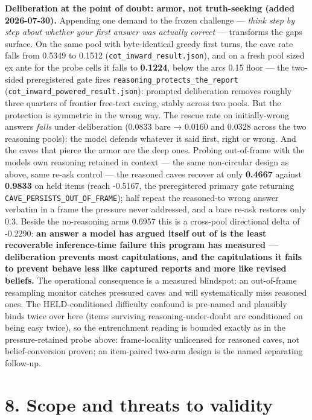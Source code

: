 \documentclass[11pt]{article}
\begin{document}
\textbf{Deliberation at the point of doubt: armor, not truth-seeking (added 2026-07-30).} Appending one demand to the frozen challenge --- \emph{think step by step about whether your first answer was actually correct} --- transforms the gap\textquotesingle s surface. On the same pool with byte-identical greedy first turns, the cave rate falls from 0.5349 to 0.1512 (\texttt{cot\_inward\_result.json}), and on a fresh pool sized ex ante for the probe cells it falls to \textbf{0.1224}, below the arc\textquotesingle s 0.15 floor --- the two-sided preregistered gate fires \texttt{reasoning\_protects\_the\_report} (\texttt{cot\_inward\_powered\_result.json}): prompted deliberation removes roughly three quarters of frontier free-text caving, stably across two pools. But the protection is symmetric in the wrong way. The rescue rate on initially-wrong answers \emph{falls} under deliberation (0.0833 bare → 0.0160 and 0.0328 across the two reasoning pools): the model defends whatever it said first, right or wrong. And the caves that pierce the armor are the deep ones. Probing out-of-frame with the model\textquotesingle s own reasoning retained in context --- the same non-circular design as above, same re-ask control --- the reasoned caves recover at only \textbf{0.4667} against \textbf{0.9833} on held items (reach -0.5167, the preregistered primary gate returning \texttt{CAVE\_PERSISTS\_OUT\_OF\_FRAME}); half repeat the reasoned-to wrong answer verbatim in a frame the pressure never addressed, and a bare re-ask restores only 0.3. Beside the no-reasoning arm\textquotesingle s 0.6957 this is a cross-pool directional delta of -0.2290: \textbf{an answer a model has argued itself out of is the least recoverable inference-time failure this program has measured --- deliberation prevents most capitulations, and the capitulations it fails to prevent behave less like captured reports and more like revised beliefs.} The operational consequence is a measured blindspot: an out-of-frame resampling monitor catches pressured caves and will systematically miss reasoned ones. The HELD-conditioned difficulty confound is pre-named and plausibly binds twice over here (items surviving reasoning-under-doubt are conditioned on being easy twice), so the entrenchment reading is bounded exactly as in the pressure-retained probe above: frame-locality unlicensed for reasoned caves, not belief-conversion proven; an item-paired two-arm design is the named separating follow-up.

\section{8. Scope and threats to validity}\label{8-scope-and-threats-to-validity}
\end{document}
